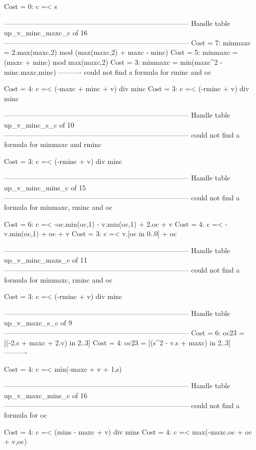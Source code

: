 Cost =  0:  c =< s

--------------------------------------------------------------------------------
Handle table up_v_minc_maxc_c of 16
--------------------------------------------------------------------------------
Cost =  7:  minmaxc = 2.max(maxc,2) mod (max(maxc,2) + maxc - minc)
Cost =  5:  minmaxc = (maxc + minc) mod max(maxc,2)
Cost =  3:  minmaxc = min(maxc^2 - minc.maxc,minc)
----------
could not find a formula for rminc and oc

Cost =  4:  c =< (-maxc + minc + v) div minc
Cost =  3:  c =< (-rminc + v) div minc

--------------------------------------------------------------------------------
Handle table up_v_minc_s_c of 10
--------------------------------------------------------------------------------
could not find a formula for minmaxc and rminc

Cost =  3:  c =< (-rminc + v) div minc

--------------------------------------------------------------------------------
Handle table up_v_minc_mins_c of 15
--------------------------------------------------------------------------------
could not find a formula for minmaxc, rminc and oc

Cost =  6:  c =< -oc.min(oc,1) - v.min(oc,1) + 2.oc + v
Cost =  4:  c =< -v.min(oc,1) + oc + v
Cost =  3:  c =< v.[oc in 0..0] + oc

--------------------------------------------------------------------------------
Handle table up_v_minc_maxs_c of 11
--------------------------------------------------------------------------------
could not find a formula for minmaxc, rminc and oc

Cost =  3:  c =< (-rminc + v) div minc

--------------------------------------------------------------------------------
Handle table up_v_maxc_s_c of 9
--------------------------------------------------------------------------------
Cost =  6:  oc23 = [(-2.s + maxc + 2.v) in 2..3]
Cost =  4:  oc23 = [(s^2 - v.s + maxc) in 2..3]
----------

Cost =  4:  c =< min(-maxc + v + 1,s)

--------------------------------------------------------------------------------
Handle table up_v_maxc_mins_c of 16
--------------------------------------------------------------------------------
could not find a formula for oc

Cost =  4:  c =< (mins - maxc + v) div mins
Cost =  4:  c =< max(-maxc.oc + oc + v,oc)

